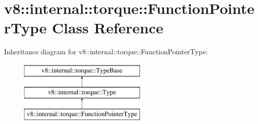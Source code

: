 \hypertarget{classv8_1_1internal_1_1torque_1_1FunctionPointerType}{}\section{v8\+:\+:internal\+:\+:torque\+:\+:Function\+Pointer\+Type Class Reference}
\label{classv8_1_1internal_1_1torque_1_1FunctionPointerType}
Inheritance diagram for v8\+:\+:internal\+:\+:torque\+:\+:Function\+Pointer\+Type\+:\begin{figure}[H]
\begin{center}
\leavevmode
\includegraphics[height=3.000000cm]{classv8_1_1internal_1_1torque_1_1FunctionPointerType}
\end{center}
\end{figure}
